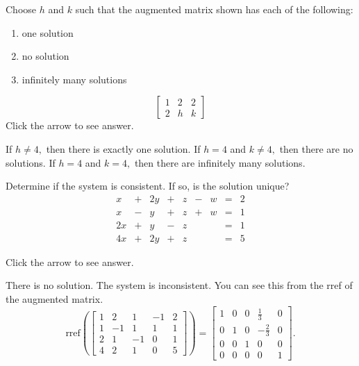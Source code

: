 \documentclass{ximera}
\begin{document}
\begin{problem}\label{prb:2.14}
Choose $h$ and $k$ such that the augmented matrix shown has each of the following:
\begin{enumerate}
\item one solution
\item no solution
\item infinitely many solutions
\end{enumerate}
\begin{equation*}
\left[
\begin{array}{rr|r}
1 & 2 & 2 \\
2 & h & k
\end{array}
\right]
\end{equation*}
Click the arrow to see answer. 
\begin{expandable}
If $h\neq 4,$ then there is exactly one solution. If $h=4$ and $k\neq 4,$
then there are no solutions. If $h=4$ and $k=4,$ then there are infinitely
many solutions.
\end{expandable}
\end{problem}

\begin{problem}\label{prb:2.15}
Determine if the system is consistent. If so, is the solution unique?
$$\begin{array}{ccccccccc}
      x & +&2y&+&z&-&w&= &2 \\
	 x& -&y&+&z&+&w&=&1\\
     2x& +&y&-&z&&&=&1\\
     4x&+&2y&+&z&&&=&5
    \end{array}$$

Click the arrow to see answer. 
\begin{expandable}
There is no solution. The system is inconsistent. You can see this from the rref of the 
augmented matrix. $$\mbox{rref}\left(\left[
\begin{array}{rrrr|r}
1 & 2 & 1 & -1 & 2 \\
1 & -1 & 1 & 1 & 1 \\
2 & 1 & -1 & 0 & 1 \\
4 & 2 & 1 & 0 & 5
\end{array}
\right]\right) = \left[
\begin{array}{rrrr|r}
1 & 0 & 0 &  \frac{1}{3} & 0 \\
0 & 1 & 0 & - \frac{2}{3} & 0 \\
0 & 0 & 1 & 0 & 0 \\
0 & 0 & 0 & 0 & 1
\end{array}
\right] .$$
\end{expandable}
\end{problem}
\end{document}

